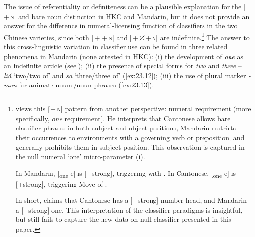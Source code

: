 \documentclass[output=paper]{langsci/langscibook}
\begin{document}
The issue of referentiality or definiteness can be a plausible explanation for
the [\Clf{}\,+\,\textsc{n}] and bare noun distinction in \gls{HKC} and Mandarin, but it
does not provide an answer for the difference in numeral-licensing function of
classifiers in the two Chinese varieties, since both [\Num{}\,+\,\Clf{}\,+\,\textsc{n}] and
[\Num{}\,+\,${\varnothing}$\,+\,\textsc{n}] are indefinite.\footnote{\citet{Huang2015} views
    this [\Clf{}\,+\,\textsc{n}] pattern from another perspective: numeral requirement
    (more specifically, \emph{one} requirement). He interprets that Cantonese
    allows bare classifier phrases in both subject and object positions,
    Mandarin restricts their occurrences to environments with a governing verb
    or preposition, and generally prohibits them in subject position. This
    observation is captured in the null numeral ‘one’ micro-parameter (i).

\begin{exe}
    \begin{xlist}
	\ex In Mandarin, [\textsubscript{one} e] is [−strong], triggering  with \Clf{}.
	\ex In Cantonese, [\textsubscript{one} e] is [+strong], triggering Move of \Clf{}.
    \end{xlist}
\end{exe}

In short, \citeauthor{Huang2015} claims that Cantonese has a [+strong] number
head, and Mandarin a [−strong] one. This interpretation of the classifier
paradigms is insightful, but still fails to capture the new data on
null-classifier  presented in this paper.} The answer to this
cross-linguistic variation in classifier use can be found in three related
phenomena in Mandarin (none attested in \gls{HKC}): (i) the development of
\emph{one} as an indefinite article (see ); (ii) the presence
of special forms for \emph{two} and \emph{three} -- \emph{liǎ} ‘two/two of’
and \emph{sā} ‘three/three of’ (\ref{ex:23.12}); (iii) the use of plural
marker \emph{-men} for animate nouns/noun phrases (\ref{ex:23.13}).\largerpage[-2]
\end{document}
